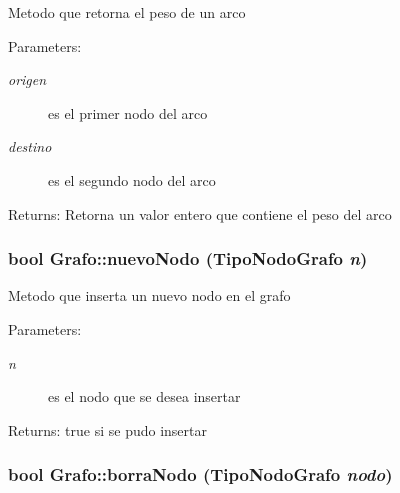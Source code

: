Metodo que retorna el peso de un arco \begin{Desc}
\item[Parameters:]
\begin{description}
\item[{\em origen}]es el primer nodo del arco \item[{\em destino}]es el segundo nodo del arco \end{description}
\end{Desc}
\begin{Desc}
\item[Returns:]Retorna un valor entero que contiene el peso del arco \end{Desc}
\hypertarget{classGrafo_05878b3e96fe9d89dc7939187e1d96d2}{
\subsubsection[nuevoNodo]{\setlength{\rightskip}{0pt plus 5cm}bool Grafo::nuevoNodo (TipoNodoGrafo {\em n})}}
\label{classGrafo_05878b3e96fe9d89dc7939187e1d96d2}


Metodo que inserta un nuevo nodo en el grafo \begin{Desc}
\item[Parameters:]
\begin{description}
\item[{\em n}]es el nodo que se desea insertar \end{description}
\end{Desc}
\begin{Desc}
\item[Returns:]true si se pudo insertar \end{Desc}
\hypertarget{classGrafo_ed70a046c1d864a2e1532cbca4216896}{
\subsubsection[borraNodo]{\setlength{\rightskip}{0pt plus 5cm}bool Grafo::borraNodo (TipoNodoGrafo {\em nodo})}}
\label{classGrafo_ed70a046c1d864a2e1532cbca4216896}


